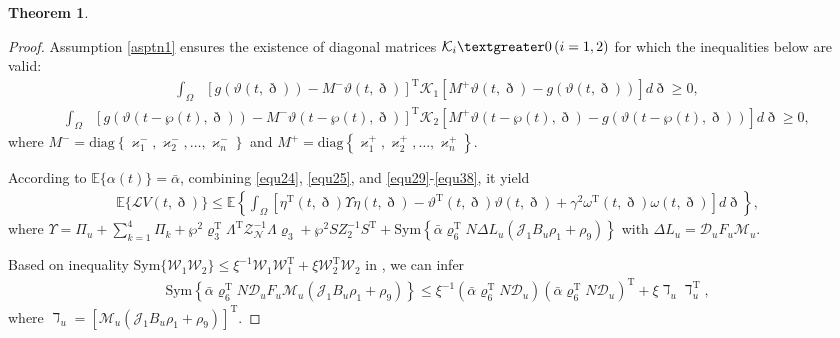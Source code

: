 \documentclass[preprint,review,fleqn,sort&compress,3p]{elsarticle}
\theoremstyle{definition}%
\newtheorem{thm}{Theorem}[section]
\begin{document}
\begin{thm}
\begin{proof}
		Assumption \ref{asptn1} ensures the existence of diagonal matrices $\mathcal{K}_i \textgreater 0 \,(i=1,2)$ for which the inequalities below are valid:
		\begin{align}
			\int_{\Omega} &\left[ g(\vartheta(t,\eth)) - M^- \vartheta(t,\eth) \right]^\text{T} \mathcal{K}_1 \left[ M^+ \vartheta(t,\eth) - g(\vartheta(t,\eth)) \right] d\eth \geq 0,
		\end{align}
		\begin{align}\label{equ38}
			\int_{\Omega} &\left[ g(\vartheta(t-\wp(t),\eth)) - M^- \vartheta(t-\wp(t),\eth) \right]^\text{T} \mathcal{K}_2 \left[ M^+ \vartheta(t-\wp(t),\eth) - g(\vartheta(t-\wp(t),\eth)) \right] d\eth \geq 0,
		\end{align}
		where $M^-=\text{diag}\left\{\varkappa_1^-,\varkappa_2^-,\dots,\varkappa_n^-\right\}$ and $M^+=\text{diag}\left\{\varkappa_1^+,\varkappa_2^+,\dots,\varkappa_n^+\right\}$.
		
		According to $\mathbb{E}\{\alpha(t)\}=\bar{\alpha}$, combining \eqref{equ24}, \eqref{equ25}, and \eqref{equ29}-\eqref{equ38}, it yield
		\begin{align}\label{equ39}
			\mathbb{E}\{ \mathcal{L} V(t, \eth) \} \leq \mathbb{E} \left\{ \int_{\Omega} \left[ \eta^\text{T}(t,\eth) \Upsilon \eta(t,\eth) - \vartheta^\text{T}(t, \eth) \vartheta(t, \eth) + \gamma^2 \omega^\text{T}(t, \eth) \omega(t, \eth) \right] d\eth \right\},
		\end{align}
		where $\Upsilon = \Pi_u+\sum_{k=1}^4 \Pi_k + \wp^2 \varrho_3^\text{T} \Lambda^\text{T} \mathcal{Z}_\mathcal{N}^{-1} \Lambda \varrho_3 + \wp^2 S Z_2^{-1} S^\text{T} + \text{Sym} \left\{ \bar{\alpha}\varrho_6^\text{T} N  \Delta L_u \left( \mathcal{J}_1 B_u \rho_1  + \rho_9 \right) \right\}$ with $\Delta L_u =\mathcal{D}_u F_u \mathcal{M}_u$.
		
		Based on inequality $\text{Sym} \{ \mathcal{W}_1 \mathcal{W}_2 \} \leq \xi^{-1} \mathcal{W}_1 \mathcal{W}_1^\text{T} + \xi \mathcal{W}_2^\text{T} \mathcal{W}_2$ in \cite{tai2023asynchronous}, we can infer
		\begin{align}
			\text{Sym} \left\{ \bar{\alpha}\varrho_6^\text{T} N \mathcal{D}_u F_u \mathcal{M}_u \left( \mathcal{J}_1 B_u \rho_1 + \rho_9  \right) \right\}
			\leq \xi^{-1} \left( \bar{\alpha}\varrho_6^\text{T} N \mathcal{D}_u \right) \left( \bar{\alpha}\varrho_6^\text{T} N \mathcal{D}_u \right)^\text{T} + \xi \daleth_u \daleth_u^\text{T},
		\end{align}
		where $\daleth_u=\left[\mathcal{M}_u \left( \mathcal{J}_1 B_u \rho_1  + \rho_9 \right)\right]^\text{T}$.
		

\end{proof}
\end{thm}
\end{document}
